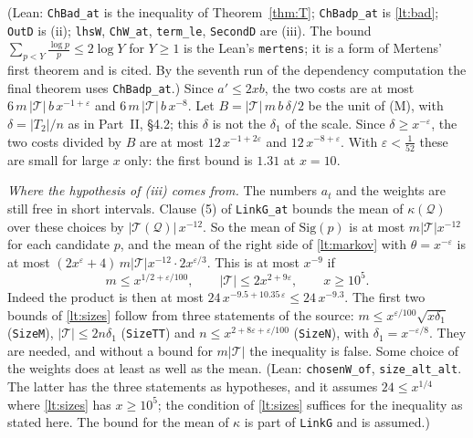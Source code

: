 \documentclass[11pt,letterpaper]{article}
\begin{document}
\noindent (Lean: \texttt{ChBad\_at} is the inequality of Theorem~\ref{thm:T}; \texttt{ChBadp\_at} is
\eqref{lt:bad}; \texttt{OutD} is (ii); \texttt{lhsW}, \texttt{ChW\_at}, \texttt{term\_le},
\texttt{SecondD} are (iii). The bound $\sum_{p<Y}\frac{\log p}p\le2\log Y$ for $Y\ge1$ is the Lean's
\texttt{mertens}; it is a form of Mertens' first theorem and is cited. By the seventh run of the
dependency computation the final theorem uses \texttt{ChBadp\_at}.) Since $a'\le2xb$, the two costs
are at most $6\,m\,|\mathcal T|\,b\,x^{-1+\varepsilon}$ and $6\,m\,|\mathcal T|\,b\,x^{-8}$. Let
$B=|\mathcal T|\,m\,b\,\delta/2$ be the unit of (M), with $\delta=|T_2|/n$ as in Part~II, \S4.2; this $\delta$ is not the $\delta_1$ of the scale. Since
$\delta\ge x^{-\varepsilon}$, the two costs divided by $B$ are at most $12\,x^{-1+2\varepsilon}$ and
$12\,x^{-8+\varepsilon}$. With $\varepsilon<\frac1{52}$ these are small for large $x$ only: the first
bound is $1.31$ at $x=10$.

\emph{Where the hypothesis of \textup{(iii)} comes from.} The numbers $a_t$ and the weights are still
free in short intervals. Clause (5) of \texttt{LinkG\_at} bounds the mean of
$\kappa(\mathcal Q)$ over these choices by $|\mathcal T(\mathcal Q)|\,x^{-12}$. So the mean of
$\mathrm{Sig}(p)$ is at most $m|\mathcal T|x^{-12}$ for each candidate $p$, and the mean of the right side
of \eqref{lt:markov} with $\theta=x^{-\varepsilon}$ is at most
$(2x^{\varepsilon}+4)\,m|\mathcal T|x^{-12}\cdot2x^{\varepsilon/3}$. This is at most $x^{-9}$ if
\begin{equation}\label{lt:sizes}
 m\le x^{1/2+\varepsilon/100},\qquad|\mathcal T|\le2x^{2+9\varepsilon},\qquad x\ge10^5 .
\end{equation}
Indeed the product is then at most $24\,x^{-9.5+10.35\,\varepsilon}\le24\,x^{-9.3}$. The first two bounds of
\eqref{lt:sizes} follow from three statements of the source: $m\le x^{\varepsilon/100}\sqrt{x\delta_1}$
(\texttt{SizeM}), $|\mathcal T|\le2n\delta_1$ (\texttt{SizeTT}) and $n\le x^{2+8\varepsilon+\varepsilon/100}$
(\texttt{SizeN}), with $\delta_1=x^{-\varepsilon/8}$. They are needed, and
without a bound for $m|\mathcal T|$ the inequality is false. Some choice of the weights does at least as
well as the mean. (Lean: \texttt{chosenW\_of}, \texttt{size\_alt\_alt}. The latter has the three statements
as hypotheses, and it assumes $24\le x^{1/4}$ where \eqref{lt:sizes} has $x\ge10^5$; the condition of
\eqref{lt:sizes} suffices for the inequality as stated here. The bound for the mean of $\kappa$
is part of \texttt{LinkG} and is assumed.)
\end{document}
